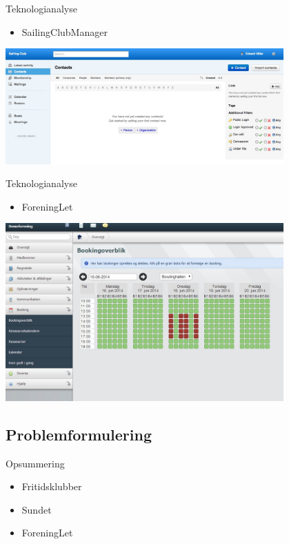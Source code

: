 \begin{frame}{Teknologianalyse}
  \begin{itemize}
    \item SailingClubManager
  \end{itemize}
\includegraphics[width=0.8\textwidth]{images/SCM.jpg}
\end{frame}

\begin{frame}{Teknologianalyse}
  \begin{itemize}
    \item ForeningLet
  \end{itemize}
        \includegraphics[width=0.8\textwidth]{images/ForeningLet.jpg}
\end{frame}


\subsection{Problemformulering}

\begin{frame}{Opsummering}
\begin{itemize}
   \item Fritidsklubber
   \item Sundet
   \item ForeningLet
\end{itemize}
\end{frame}


